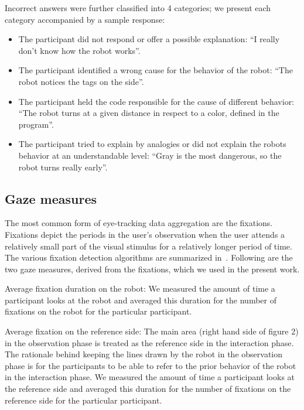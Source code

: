 \documentclass{sig-alternate}
\begin{document}
Incorrect answers were further classified into 4 categories; we present
each category accompanied by a sample response:

\begin{itemize}
    \item The participant did not respond or offer a possible explanation: ``I
        really don't know how the robot works''.

    \item The participant identified a wrong cause for the behavior of the robot:
        ``The robot notices the tags on the side''.

    \item The participant held the code responsible for the cause of different
        behavior: ``The robot turns at a given distance in respect to a color,
        defined in the program''.

    \item The participant tried to explain by analogies or did not explain the
        robots behavior at an understandable level: ``Gray is the most
        dangerous, so the robot turns really early''.

\end{itemize}

\subsection{Gaze measures}

The most common form of eye-tracking data aggregation are the fixations.
Fixations depict the periods in the user's observation when the user
attends a relatively small part of the visual stimulus for a relatively
longer period of time. The various fixation detection algorithms are
summarized in~\cite{duchowski2007eye}. Following are the two gaze measures, derived
from the fixations, which we used in the present work.

Average fixation duration on the robot: We measured the amount of time a
participant looks at the robot and averaged this duration for the number
of fixations on the robot for the particular participant.

Average fixation on the reference side: The main area (right hand side
of figure 2) in the observation phase is treated as the reference side
in the interaction phase. The rationale behind keeping the lines drawn
by the robot in the observation phase is for the participants to be able
to refer to the prior behavior of the robot in the interaction phase. We
measured the amount of time a participant looks at the reference side
and averaged this duration for the number of fixations on the reference
side for the particular participant.
\end{document}
